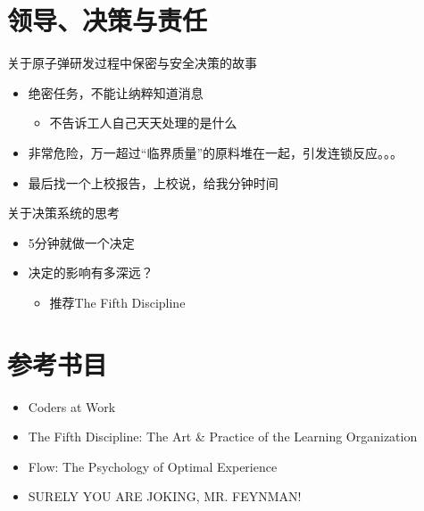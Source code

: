 \documentclass[presentation,dvipdfmx,CJKbookmarks]{beamer}
\begin{document}
\begin{CJK*}{UTF8}{simsun}
\section{领导、决策与责任}
\label{sec:orgee672e4}

\begin{frame}[label={sec:org73fad34}]{关于原子弹研发过程中保密与安全决策的故事}
\begin{itemize}
\item 绝密任务，不能让纳粹知道消息
\begin{itemize}
\item 不告诉工人自己天天处理的是什么
\end{itemize}
\item 非常危险，万一超过“临界质量”的原料堆在一起，引发连锁反应。。。
\item 最后找一个上校报告，上校说，给我\thinspace 分钟时间
\end{itemize}
\end{frame}

\begin{frame}[label={sec:orga827258}]{关于决策系统的思考}
\begin{itemize}
\item 5\thinspace 分钟就做一个决定
\item 决定的影响有多深远？

\begin{itemize}
\item 推荐\thinspace The Fifth Discipline
\end{itemize}
\end{itemize}
\end{frame}

\section{参考书目}
\label{sec:org8991233}

\begin{frame}[label={sec:org9476bb8}]{}
\begin{itemize}
\item Coders at Work
\item The Fifth Discipline: The Art \& Practice of the Learning Organization
\item Flow: The Psychology of Optimal Experience
\item SURELY YOU ARE JOKING, MR. FEYNMAN!
\end{itemize}
\end{frame}
\end{CJK*}
\end{document}
